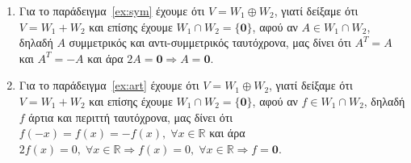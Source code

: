 \begin{examples}
\begin{enumerate}
\[\begin{matrix*}[r]
                        2a+3b+5c=0 \\
                        a-b+2c=0
                    \end{matrix*}
                \right\} \Leftrightarrow 
                \left.
                    \begin{matrix*}[r]
                        2a+3b+5c=0 \\
                        a=b-2c
                    \end{matrix*}
                \right\} \Leftrightarrow
                \left.
                    \begin{matrix*}[r]
                        5b+c=0 \\
                        a=b-2c
                    \end{matrix*}
                \right\} \Leftrightarrow
                \left.
                    \begin{matrix*}[r]
                        c=-5b \\
                        a=b-2c
                    \end{matrix*}
                \right\} \Leftrightarrow
                \left.
                    \begin{matrix*}[r]
                        c=-5b \\
                        a=11b
                    \end{matrix*}
                \right\}
            \]

            Άρα για $ b=1, c=-5 $ και $ a=11 $ έχουμε το επίπεδο $ 11x+y-5z=0 $.

            Επομένως έχουμε ότι το επίπεδο $ V: 11x+y-5z=0 $ είναι το 
            ευθύ άθροισμα των ευθειών $ W_{1}: \frac{x}{2} = \frac{y}{3} = 
            \frac{z}{5}$ και $ W_{2}: x=-y= \frac{z}{2} $, καθώς 
            $ V = W_{1}+W_{2} $ και $ W_{1}\cap W_{2} = \{ \mathbf{0} \} $.

        \item Για το παράδειγμα~\ref{ex:sym} έχουμε ότι $ V = W_{1} \oplus W_{2} $, 
            γιατί δείξαμε ότι $ V= W_{1}+W_{2} $ και επίσης έχουμε 
            $ W_{1} \cap W_{2} = \{ \mathbf{0} \} $, 
            αφού αν $A \in W_{1} \cap W_{2}$, δηλαδή $ A $ συμμετρικός και 
            αντι-συμμετρικός ταυτόχρονα, μας δίνει ότι $ A^{T} = A $ και 
            $ A^{T}=-A $ και άρα $ 2A = \mathbf{0} \Rightarrow A= \mathbf{0} $.

        \item Για το παράδειγμα~\ref{ex:art} έχουμε ότι $ V = W_{1} \oplus W_{2} $, 
            γιατί δείξαμε ότι $ V= W_{1}+W_{2} $ και επίσης έχουμε 
            $ W_{1} \cap W_{2} = \{ \mathbf{0} \} $, 
            αφού αν $f \in W_{1} \cap W_{2}$, δηλαδή $ f $ άρτια και περιττή 
            ταυτόχρονα, μας δίνει ότι $ f(-x)=f(x)=-f(x), \; \forall x \in 
            \mathbb{R} $ και άρα $ 2f(x) = 0, \; \forall x \in 
            \mathbb{R} \Rightarrow f(x)=0, \; \forall x \in \mathbb{R} 
            \Rightarrow f = \mathbf{0} $.
    \end{enumerate}
\end{examples}

